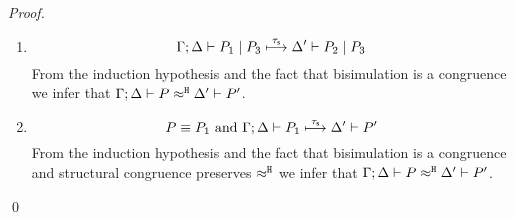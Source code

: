 \begin{proof}
\begin{enumerate}
		\item  %
		\[
			\Gamma; \Delta \vdash P_1 \;|\; P_3 \stackrel{\tau_{\mathsf{s}}}{\longmapsto} \Delta' \vdash P_2 \;|\; P_3
		\]
		\noi From the induction hypothesis and the fact that bisimulation is a congruence
		we infer that $\Gamma; \Delta \vdash P \approx^\mathtt{H} \Delta' \vdash P'$.

		\item   %
			\[
				P \equiv P_1 \text{ and }\Gamma; \Delta \vdash P_1 \stackrel{\tau_{\mathsf{s}}}{\longmapsto} \Delta' \vdash P'
			\]
%
		From the induction hypothesis and the fact that bisimulation is a congruence 
		and structural congruence preserves $\approx^\mathtt{H}$
		we infer that $\Gamma; \Delta \vdash P \approx^\mathtt{H} \Delta' \vdash P'$.
	\end{enumerate}
	\qed
\end{proof}


